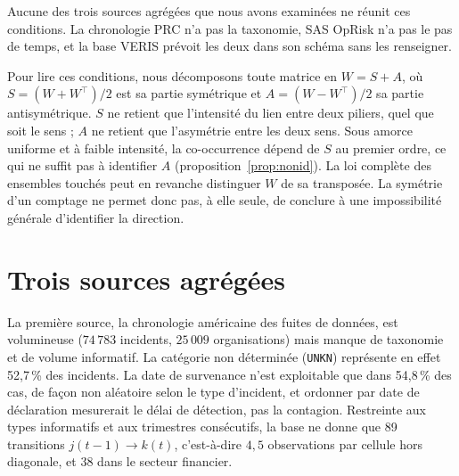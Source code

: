 Aucune des trois sources agrégées que nous avons examinées ne réunit ces conditions. La chronologie
PRC n'a pas la taxonomie, SAS OpRisk n'a pas le pas de temps, et la base VERIS prévoit les deux dans
son schéma sans les renseigner.

Pour lire ces conditions, nous décomposons toute matrice en $W=S+A$, où $S=(W+W^\top)/2$ est sa partie symétrique et $A=(W-W^\top)/2$ sa partie antisymétrique. $S$ ne retient que l'intensité du lien entre deux piliers, quel que soit le sens ; $A$ ne retient que l'asymétrie entre les deux sens. Sous amorce uniforme et à faible intensité, la co-occurrence dépend de $S$ au premier ordre,
ce qui ne suffit pas à identifier $A$ (proposition~\ref{prop:nonid}). La loi complète des ensembles
touchés peut en revanche distinguer $W$ de sa transposée. La symétrie d'un comptage ne permet
donc pas, à elle seule, de conclure à une impossibilité générale d'identifier la direction.

\section{Trois sources agrégées}

La première source, la chronologie américaine des fuites de données, est volumineuse
($74\,783$ incidents, $25\,009$ organisations) mais manque de taxonomie et de volume informatif. La
catégorie non déterminée (\texttt{UNKN}) représente en effet 52,7\,\% des incidents. La date de
survenance n'est exploitable que dans 54,8\,\% des cas, de façon non aléatoire selon le type
d'incident, et ordonner par date de déclaration mesurerait le délai de détection, pas la contagion.
Restreinte aux types informatifs et aux trimestres consécutifs, la base ne donne que 89 transitions
$j(t\!-\!1)\to k(t)$, c'est-à-dire $4{,}5$ observations par cellule hors diagonale, et 38 dans le
secteur financier.

